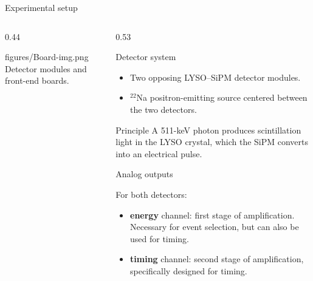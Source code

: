 \begin{frame}{Experimental setup}

\small

\begin{columns}[T,totalwidth=\textwidth]

\begin{column}{0.44\textwidth}

\centering

\smartimage[0.96\linewidth]{0.84\textheight}
{figures/Board-img.png}
{Detector modules and front-end boards.}

\end{column}

\begin{column}{0.53\textwidth}
\vspace{-0.4cm}
\begin{block}{Detector system}

\begin{itemize}

    \item Two opposing LYSO--SiPM detector modules.

    \item $^{22}$Na positron-emitting source centered between the two detectors.

\end{itemize}

\end{block}

\begin{alertblock}{Principle}
  A 511-keV photon produces scintillation light in the LYSO crystal, which the SiPM converts into an electrical pulse.

\end{alertblock}

\begin{block}{Analog outputs}

For both detectors:

\begin{itemize}

    \item \textbf{energy} channel: first stage of amplification. Necessary for event selection, but can also be used for timing.

    \item \textbf{timing} channel: second stage of amplification, specifically designed for timing.

\end{itemize}

\end{block}

\end{column}

\end{columns}

\end{frame}